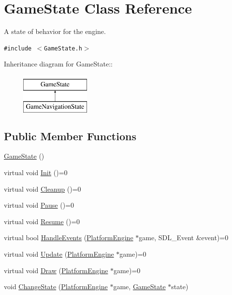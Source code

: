 \hypertarget{class_game_state}{
\section{GameState Class Reference}
\label{class_game_state}
}
A state of behavior for the engine.  


{\tt \#include $<$GameState.h$>$}

Inheritance diagram for GameState::\begin{figure}[H]
\begin{center}
\leavevmode
\includegraphics[height=2cm]{class_game_state}
\end{center}
\end{figure}
\subsection*{Public Member Functions}
\begin{CompactItemize}
\item 
\hyperlink{class_game_state_4fa0a2bf50315c4a35a3890a0adcee5c}{GameState} ()
\item 
virtual void \hyperlink{class_game_state_eec488593bae214c0f738bd64dafba32}{Init} ()=0
\item 
virtual void \hyperlink{class_game_state_041e7a5430d71da84745af11abdacd93}{Cleanup} ()=0
\item 
virtual void \hyperlink{class_game_state_1f4d2b5a2e4dcb7645e3e7a5735926a6}{Pause} ()=0
\item 
virtual void \hyperlink{class_game_state_cf9bcd5b47ebb3f572389f64c5ca5ed4}{Resume} ()=0
\item 
virtual bool \hyperlink{class_game_state_de7bd9bda91253614322ca0ea77b7a14}{HandleEvents} (\hyperlink{class_platform_engine}{PlatformEngine} $\ast$game, SDL\_\-Event \&event)=0
\item 
virtual void \hyperlink{class_game_state_100ca49bc95afce1d5c5b756708bbc2b}{Update} (\hyperlink{class_platform_engine}{PlatformEngine} $\ast$game)=0
\item 
virtual void \hyperlink{class_game_state_7333dda0f49b3fa1c01cd3295f853024}{Draw} (\hyperlink{class_platform_engine}{PlatformEngine} $\ast$game)=0
\item 
void \hyperlink{class_game_state_f786aeb704a22a135dc289bb89fcc452}{ChangeState} (\hyperlink{class_platform_engine}{PlatformEngine} $\ast$game, \hyperlink{class_game_state}{GameState} $\ast$state)
\end{CompactItemize}


